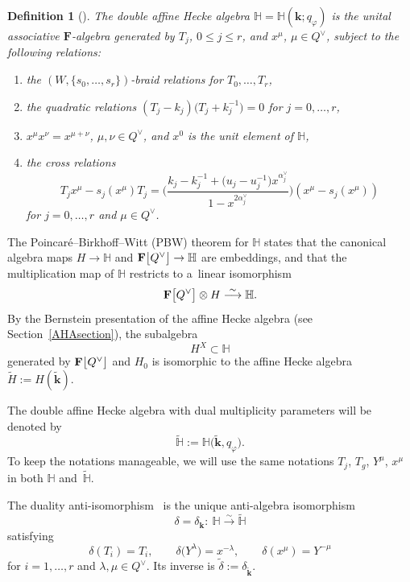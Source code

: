 \documentclass[pdftex]{sigma}
\numberwithin{equation}{section}
\newtheorem{Definition}[Theorem]{Definition}
\begin{document}
\begin{Definition}[\cite{ChKZ2,Sa}]
The double affine Hecke algebra $\mathbb{H}=\mathbb{H}(\mathbf{k};q_\varphi)$ is the unital associative $\mathbf{F}$-algebra generated by
$T_j$, $0\leq j\leq r$, and $x^\mu$, $\mu\in Q^\vee$, subject to the following relations:
\begin{enumerate}\itemsep=0pt
\item[(a)] the $(W,\{s_0,\dots,s_r\})$-braid relations for $T_0,\dots,T_r$,
\item[(b)] the quadratic relations $(T_j-k_j)\bigl(T_j+k_j^{-1}\bigr)=0$ for $j=0,\dots,r$,
\item[(c)] $x^\mu x^\nu=x^{\mu+\nu}$, $\mu,\nu\in Q^\vee$, and $x^0$ is the unit element of $\mathbb{H}$,
\item[(d)] the cross relations
\begin{equation}\label{crossX}
T_jx^\mu-s_j(x^\mu)T_j=\Biggl(\frac{k_j-k_j^{-1}+\bigl(u_j-u_j^{-1}\bigr)x^{\alpha_j^\vee}}{1-x^{2\alpha_j^\vee}}\Biggr)(x^\mu-s_j(x^\mu))
\end{equation}
for $j=0,\dots,r$ and $\mu\in Q^\vee$.
\end{enumerate}
\end{Definition}
The Poincar{\'e}--Birkhoff--Witt (PBW) theorem for $\mathbb{H}$ states that the canonical algebra maps $H\rightarrow \mathbb{H}$ and $\mathbf{F}\smash{\bigl[Q^\vee\bigr]}\rightarrow
\mathbb{H}$
are embeddings, and that
the multiplication map of $\mathbb{H}$ restricts to a~linear isomorphism
\[
\mathbf{F}\smash{\bigl[Q^\vee\bigr]}\otimes H\overset{\sim}{\longrightarrow} \mathbb{H}.
\]
By the Bernstein presentation of the affine Hecke algebra (see Section~\ref{AHAsection}), the subalgebra
\[
H^X\subset\mathbb{H}
\]
generated by $\mathbf{F}\smash{\bigl[Q^\vee\bigr]}$ and $H_0$ is isomorphic to the affine Hecke algebra $\widetilde{H}:=H(\widetilde{\mathbf{k}})$.

The double affine Hecke algebra with dual multiplicity parameters will be denoted by
\[
\widetilde{\mathbb{H}}:=\mathbb{H}\bigl(\widetilde{\mathbf{k}},q_\varphi\bigr).
\]
To keep the notations manageable, we will use the same notations $T_j$, $T_g$, $Y^\mu$, $x^\mu$ in both $\mathbb{H}$ and~$\widetilde{\mathbb{H}}$.

The duality anti-isomorphism~\cite{ChBook,Sa} is the unique anti-algebra isomorphism
\[
\delta=\delta_{\mathbf{k}}\colon\ \mathbb{H}\overset{\sim}{\longrightarrow}\widetilde{\mathbb{H}}
\]
satisfying
\[
\delta(T_i)=T_i,\qquad \delta\bigl(Y^\lambda\bigr)=x^{-\lambda},\qquad \delta(x^\mu)=Y^{-\mu}
\]
for $i=1,\dots,r$ and $\lambda,\mu\in Q^\vee$. Its inverse is $\widetilde{\delta}:=\delta_{\widetilde{\mathbf{k}}}$.
\end{document}

